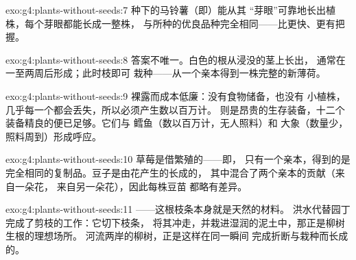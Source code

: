 \begin{solution}{exo:g4:plants-without-seeds:7}
种下的马铃薯（即）能从其
“芽眼”可靠地长出植株，每个芽眼都能长成一整株，
与所种的优良品种完全相同——比更快、更有把握。
\end{solution}

\begin{solution}{exo:g4:plants-without-seeds:8}
答案不唯一。白色的根从浸没的茎上长出，
通常在一至两周后形成；此时枝即可
栽种——从一个亲本得到一株完整的新薄荷。
\end{solution}

\begin{solution}{exo:g4:plants-without-seeds:9}
裸露而成本低廉：没有食物储备，也没有
小植株，几乎每一个都会丢失，所以必须产生数以百万计。
则是昂贵的生存装备，十二个装备精良的便已足够。它们与
鳕鱼（数以百万计，无人照料）和
大象（数量少，照料周到）形成呼应。
\end{solution}

\begin{solution}{exo:g4:plants-without-seeds:10}
草莓是借繁殖的——即，
只有一个亲本，得到的是完全相同的复制品。豆子是由花产生的长成的，
其中混合了两个亲本的贡献（来自一朵花，
来自另一朵花），因此每株豆苗
都略有差异。
\end{solution}

\begin{solution}{exo:g4:plants-without-seeds:11}
——这根枝条本身就是天然的材料。
洪水代替园丁完成了剪枝的工作：它切下枝条，
将其冲走，并栽进湿润的泥土中，那正是柳树生根的理想场所。
河流两岸的柳树，正是这样在同一瞬间
完成折断与栽种而长成的。
\end{solution}
